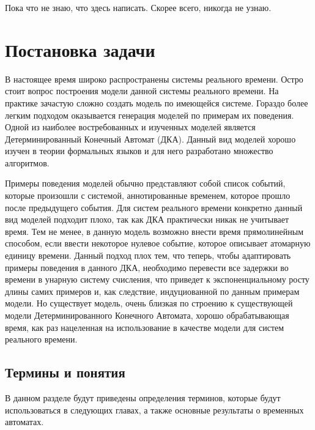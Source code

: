 \documentclass[times,specification,annotation]{itmo-student-thesis}
\begin{document}

\tableofcontents

\startprefacepage

Пока что не знаю, что здесь написать. Скорее всего, никогда не узнаю.

\chapter{Постановка задачи}

В настоящее время широко распространены системы реального времени. 
Остро стоит вопрос построения модели данной системы реального времени. 
На практике зачастую сложно создать модель по имеющейся системе. 
Гораздо более легким подходом оказывается генерация моделей по примерам их поведения. 
Одной из наиболее востребованных и изученных моделей является Детерминированный Конечный Автомат (ДКА). 
Данный вид моделей хорошо изучен в теории формальных языков и для него разработано множество алгоритмов.

Примеры поведения моделей обычно представляют собой список событий, которые произошли с системой, аннотированные временем, которое прошло после предыдущего события.
Для систем реального времени конкретно данный вид моделей подходит плохо, так как ДКА практически никак не учитывает время. 
Тем не менее, в данную модель возможно внести время прямолинейным способом, если ввести некоторое нулевое событие, которое описывает атомарную единицу времени. 
Данный подход плох тем, что теперь, чтобы адаптировать примеры поведения в данного ДКА, необходимо перевести все задержки во времени в унарную систему счисления, что приведет к экспоненциальному росту длины самих примеров и, как следствие, индуциованной по данным примерам модели.
Но существует модель, очень близкая по строению к существующей модели Детерминированного Конечного Автомата, хорошо обрабатывающая время, как раз нацеленная на использование в качестве модели для систем реального времени.

\section{Термины и понятия}
В данном разделе будут приведены определения терминов, которые будут использоваться в следующих главах, а также основные результаты о временных автоматах.
\end{document}
